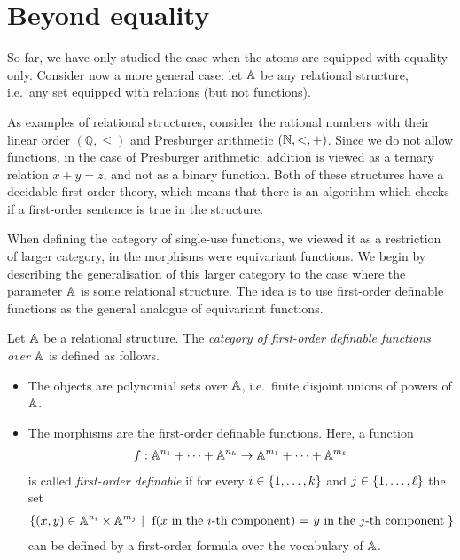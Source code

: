 \section{Beyond equality}
\label{sec:beyond-equality}

So far, we have only studied the case when the atoms are equipped with equality only. Consider now a more general case: let $\mathbb A$ be any relational structure, i.e.~any set equipped with relations (but not functions).

\begin{example} As examples of relational structures, consider the  rational numbers with their linear order $(\mathbb Q, \le)$ and  Presburger arithmetic $({\mathbb N}, <, +)$. Since we do not allow functions, in the case of Presburger arithmetic, addition is viewed as a ternary relation $x + y = z$, and not as a binary function. Both of these structures have a decidable first-order theory, which means that there is an algorithm which checks if a first-order sentence is true in the structure. 
\end{example}

When defining the category of single-use functions, we viewed it as a restriction of larger category, in the morphisms were equivariant functions.  We begin by describing the generalisation of this larger category to the case where the parameter $\mathbb A$ is some relational structure. The idea is to use first-order definable functions as the general analogue of equivariant functions. 

\begin{definition}
    Let $\mathbb A$ be a relational structure. The \emph{category of first-order definable functions over $\mathbb A$} is defined as follows.
    \begin{itemize}
        \item The objects are polynomial sets over $\mathbb A$, i.e.~finite disjoint unions of powers of $\mathbb A$.
        \item The morphisms are the  first-order definable functions. Here, a function 
        \begin{align*}
            f : \mathbb A^{n_1} + \cdots + \mathbb A^{n_k} \to \mathbb A^{m_1} + \cdots + \mathbb A^{m_\ell}
            \end{align*}
            is called  \emph{first-order definable} if for every $i \in \{1,\ldots,k\}$ and  $j \in \{1,\ldots,\ell\}$ the set 
            \begin{align*}
            \setbuild{ (x,y) \in \atoms^{n_i} \times \atoms^{m_j}}{f(\text{$x$ in the $i$-th component}) = \text{$y$ in the $j$-th component}}
            \end{align*}
            can be defined by a first-order formula over the vocabulary of $\mathbb A$.
    \end{itemize}
\end{definition}


